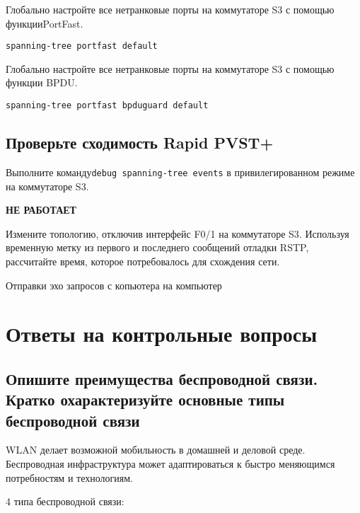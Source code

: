 Глобально настройте все нетранковые порты
на коммутаторе S3 с помощью функцииPortFast.

\begin{verbatim}
spanning-tree portfast default
\end{verbatim}

Глобально настройте все нетранковые порты
на коммутаторе S3 с помощью функции BPDU.

\begin{verbatim}
spanning-tree portfast bpduguard default
\end{verbatim}

\subsection{Проверьте сходимость Rapid PVST+}

Выполните команду\texttt{debug spanning-tree events} 
в привилегированном режиме на коммутаторе S3.

\textbf{НЕ РАБОТАЕТ}

Измените топологию, отключив интерфейс F0/1 на коммутаторе S3.
Используя временную метку из первого и последнего сообщений отладки RSTP,
рассчитайте время, которое потребовалось для схождения сети.

\begin{image}
	\caption{Отправки эхо запросов с копьютера на компьютер}
\end{image}

\section{Ответы на контрольные вопросы}

\subsection{Опишите преимущества беспроводной связи.
	Кратко охарактеризуйте основные типы беспроводной связи}

WLAN делает возможной мобильность в домашней и деловой среде. 
Беспроводная инфраструктура может адаптироваться к быстро меняющимся 
потребностям и технологиям.

4 типа беспроводной связи:


